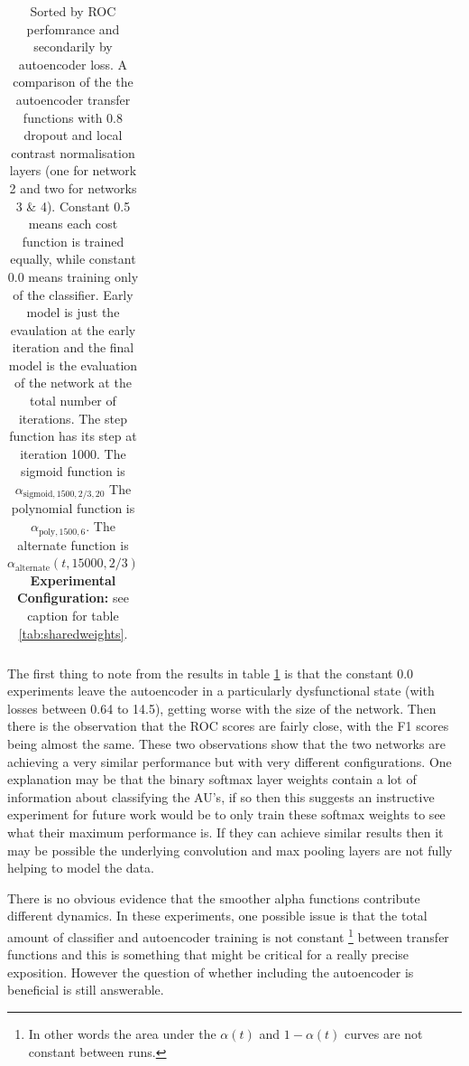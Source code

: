 \begin{table}[]
{\begin{tabular}{rrrrrrrrrrr}
          \hline
          \end{tabular}
          }
          \caption{Sorted by ROC perfomrance and secondarily by autoencoder loss.
          A comparison of the the autoencoder transfer functions with 0.8 dropout and local contrast normalisation layers (one for network 2 and two for networks 3 \& 4).
          Constant 0.5 means each cost function is trained equally, while constant 0.0 means training only of the classifier.
          Early model is just the evaulation at the early iteration and the final model is the evaluation of the network at the total number of iterations.
          The step function has its step at iteration 1000.
          The sigmoid function is $\alpha_{\text{sigmoid},1500,2/3,20}$
          The polynomial function is $\alpha_{\text{poly},1500,6}$.
          The alternate function is $\alpha_{\text{alternate}}(t,15000,2/3)$
          {\bf Experimental Configuration:} see caption for table \ref{tab:sharedweights}.} \label{tab:auto_final_1}
        \end{table}

          The first thing to note from the results in table \ref{tab:auto_final_1} is that
          the constant 0.0 experiments leave the autoencoder in a particularly dysfunctional state (with losses between 0.64 to 14.5),
          getting worse with the size of the network. Then there is the observation that
          the ROC scores are fairly close, with the F1 scores being almost the same. These two
          observations show that the two networks are achieving a very similar performance but
          with very different configurations. One explanation may be that the binary softmax layer weights
          contain a lot of information about classifying the AU's, if so then this suggests an
          instructive experiment for future work would be to only train these softmax weights to see
          what their maximum performance is. If they can achieve similar results then it may be possible
          the underlying convolution and max pooling layers are not fully helping to model the data.

          There is no obvious evidence that the smoother alpha functions contribute different
          dynamics. In these experiments, one possible issue is that
          the total amount of classifier and autoencoder training is not constant
          \footnote{In other words the area under the $\alpha(t)$ and $1-\alpha(t)$ curves are not constant between runs.}
          between transfer functions
          and this is something that might be critical for a really precise exposition. However the question of whether
          including the autoencoder is beneficial is still answerable.

